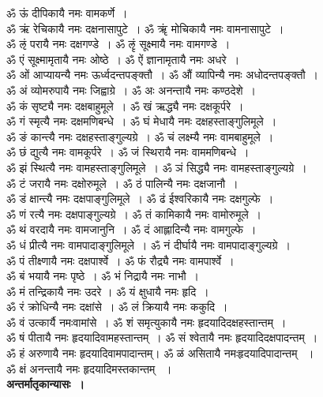\documentclass[twoside,top=1.7cm, bottom=1.7cm, outer=1cm,landscape, inner=1.5cm,a5paper,]{book}
\begin{document}
ॐ ऊं दीपिकायै नमः वामकर्णे~।\\
ॐ ऋं रेचिकायै नमः दक्षनासापुटे~।
ॐ ॠं मोचिकायै नमः वामनासापुटे~।\\
ॐ ऌं परायै नमः दक्षगण्डे~।
ॐ ऌृं सूक्ष्मायै नमः वामगण्डे~।\\
ॐ एं सूक्ष्मामृतायै नमः ओष्ठे~।
ॐ ऐं ज्ञानामृतायै नमः अधरे~।\\
ॐ ओं आप्यायन्यै नमः ऊर्ध्वदन्तपङ्क्तौ~।
ॐ औं व्यापिन्यै नमः अधोदन्तपङ्क्तौ~।\\
ॐ अं व्योमरुपायै नमः जिह्वाग्रे~।
ॐ अः अनन्तायै नमः कण्ठदेशे~।\\
ॐ कं सृष्ट्यै नमः दक्षबाहुमूले~।
ॐ खं ऋद्ध्यै नमः दक्षकूर्परे~।\\
ॐ गं स्मृत्यै नमः दक्षमणिबन्धे~।
ॐ घं मेधायै नमः दक्षहस्ताङ्गुलिमूले~।\\
ॐ ङं कान्त्यै नमः दक्षहस्ताङ्गुल्यग्रे~। 
ॐ चं लक्ष्म्यै नमः वामबाहुमूले~।\\
ॐ छं द्युत्यै नमः वामकूर्परे~।
ॐ जं स्थिरायै नमः वाममणिबन्धे~।\\
ॐ झं स्थित्यै नमः वामहस्ताङ्गुलिमूले~।
ॐ ञं सिद्ध्यै नमः वामहस्ताङ्गुल्यग्रे~।\\
ॐ टं जरायै नमः दक्षोरुमूले~।
ॐ ठं पालिन्यै नमः दक्षजानौ~।\\
ॐ डं क्षान्त्यै नमः दक्षपाङ्गुलिमूले~।
ॐ ढं ईश्वरिकायै नमः दक्षगुल्फे~।\\
ॐ णं रत्यै नमः दक्षपाङ्गुल्यग्रे~।
ॐ तं कामिकायै नमः  वामोरुमूले~।\\
ॐ थं वरदायै नमः वामजानुनि~।
ॐ दं आह्लादिन्यै नमः वामगुल्फे~।\\
ॐ धं प्रीत्यै नमः वामपादाङ्गुलिमूले~।
ॐ नं दीर्घायै नमः वामपादाङ्गुल्यग्रे~।\\
ॐ पं तीक्ष्णायै नमः दक्षपार्श्वे~।
ॐ फं रौद्र्यै नमः  वामपार्श्वे~।\\
ॐ बं भयायै नमः  पृष्ठे~।
ॐ भं निद्रायै नमः नाभौ~।\\
ॐ मं तन्द्रिकायै नमः उदरे ।
ॐ यं क्षुधायै नमः हृदि~।\\
ॐ रं क्रोधिन्यै नमः दक्षांसे~।  
ॐ लं क्रियायै नमः ककुदि~।\\
ॐ वं उत्कार्यै नमःवामांसे~।
ॐ शं समृत्युकायै नमः  हृदयादिदक्षहस्तान्तम्~।\\
ॐ षं पीतायै नमः हृदयादिवामहस्तान्तम्~।
ॐ सं श्वेतायै नमः हृदयादिदक्षपादन्तम्~।\\
ॐ हं अरुणायै नमः हृदयादिवामपादान्तम्।
ॐ ळं असितायै नमःहृदयादिपादान्तम् ~।\\
ॐ क्षं अनन्तायै नमः हृदयादिमस्तकान्तम् ~।\\[10pt]
{\bfseries अन्तर्मातृकान्यासः~।}\\
\end{document}
